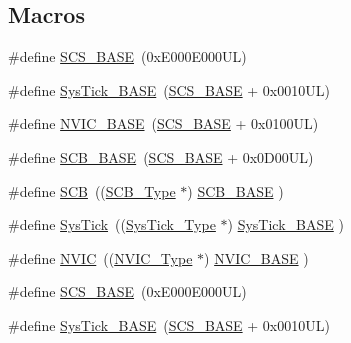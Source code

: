 \subsection*{Macros}
\begin{DoxyCompactItemize}
\item 
\#define \hyperlink{group___c_m_s_i_s__core__base_ga3c14ed93192c8d9143322bbf77ebf770}{S\+C\+S\+\_\+\+B\+A\+SE}~(0x\+E000\+E000\+U\+L)
\item 
\#define \hyperlink{group___c_m_s_i_s__core__base_ga58effaac0b93006b756d33209e814646}{Sys\+Tick\+\_\+\+B\+A\+SE}~(\hyperlink{group___c_m_s_i_s__core__base_ga3c14ed93192c8d9143322bbf77ebf770}{S\+C\+S\+\_\+\+B\+A\+SE} +  0x0010\+U\+L)
\item 
\#define \hyperlink{group___c_m_s_i_s__core__base_gaa0288691785a5f868238e0468b39523d}{N\+V\+I\+C\+\_\+\+B\+A\+SE}~(\hyperlink{group___c_m_s_i_s__core__base_ga3c14ed93192c8d9143322bbf77ebf770}{S\+C\+S\+\_\+\+B\+A\+SE} +  0x0100\+U\+L)
\item 
\#define \hyperlink{group___c_m_s_i_s__core__base_gad55a7ddb8d4b2398b0c1cfec76c0d9fd}{S\+C\+B\+\_\+\+B\+A\+SE}~(\hyperlink{group___c_m_s_i_s__core__base_ga3c14ed93192c8d9143322bbf77ebf770}{S\+C\+S\+\_\+\+B\+A\+SE} +  0x0\+D00\+U\+L)
\item 
\#define \hyperlink{group___c_m_s_i_s__core__base_gaaaf6477c2bde2f00f99e3c2fd1060b01}{S\+CB}~((\hyperlink{struct_s_c_b___type}{S\+C\+B\+\_\+\+Type}       $\ast$)     \hyperlink{group___c_m_s_i_s__core__base_gad55a7ddb8d4b2398b0c1cfec76c0d9fd}{S\+C\+B\+\_\+\+B\+A\+SE}      )
\item 
\#define \hyperlink{group___c_m_s_i_s__core__base_gacd96c53beeaff8f603fcda425eb295de}{Sys\+Tick}~((\hyperlink{struct_sys_tick___type}{Sys\+Tick\+\_\+\+Type}   $\ast$)     \hyperlink{group___c_m_s_i_s__core__base_ga58effaac0b93006b756d33209e814646}{Sys\+Tick\+\_\+\+B\+A\+SE}  )
\item 
\#define \hyperlink{group___c_m_s_i_s__core__base_gac8e97e8ce56ae9f57da1363a937f8a17}{N\+V\+IC}~((\hyperlink{struct_n_v_i_c___type}{N\+V\+I\+C\+\_\+\+Type}      $\ast$)     \hyperlink{group___c_m_s_i_s__core__base_gaa0288691785a5f868238e0468b39523d}{N\+V\+I\+C\+\_\+\+B\+A\+SE}     )
\item 
\#define \hyperlink{group___c_m_s_i_s__core__base_ga3c14ed93192c8d9143322bbf77ebf770}{S\+C\+S\+\_\+\+B\+A\+SE}~(0x\+E000\+E000\+U\+L)
\item 
\#define \hyperlink{group___c_m_s_i_s__core__base_ga58effaac0b93006b756d33209e814646}{Sys\+Tick\+\_\+\+B\+A\+SE}~(\hyperlink{group___c_m_s_i_s__core__base_ga3c14ed93192c8d9143322bbf77ebf770}{S\+C\+S\+\_\+\+B\+A\+SE} +  0x0010\+U\+L)

\end{DoxyCompactItemize}
